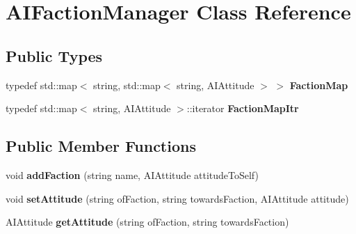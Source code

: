 \hypertarget{classAIFactionManager}{
\section{\-A\-I\-Faction\-Manager \-Class \-Reference}
\label{d2/db2/classAIFactionManager}
}
\subsection*{\-Public \-Types}
\begin{DoxyCompactItemize}
\item 
\hypertarget{classAIFactionManager_a6063adb15104d0396201d3a833c42b50}{
typedef std\-::map$<$ string, \*
std\-::map$<$ string, \-A\-I\-Attitude $>$ $>$ {\bfseries \-Faction\-Map}}
\label{d2/db2/classAIFactionManager_a6063adb15104d0396201d3a833c42b50}

\item 
\hypertarget{classAIFactionManager_a6bdacc5758c36c0369dd50d7816529f6}{
typedef std\-::map$<$ string, \*
\-A\-I\-Attitude $>$\-::iterator {\bfseries \-Faction\-Map\-Itr}}
\label{d2/db2/classAIFactionManager_a6bdacc5758c36c0369dd50d7816529f6}

\end{DoxyCompactItemize}
\subsection*{\-Public \-Member \-Functions}
\begin{DoxyCompactItemize}
\item 
\hypertarget{classAIFactionManager_a23a4aa0eeec79f6a33266de652941336}{
void {\bfseries add\-Faction} (string name, \-A\-I\-Attitude attitude\-To\-Self)}
\label{d2/db2/classAIFactionManager_a23a4aa0eeec79f6a33266de652941336}

\item 
\hypertarget{classAIFactionManager_a8d59f0824b36f0da3352c3baa2a68179}{
void {\bfseries set\-Attitude} (string of\-Faction, string towards\-Faction, \-A\-I\-Attitude attitude)}
\label{d2/db2/classAIFactionManager_a8d59f0824b36f0da3352c3baa2a68179}

\item 
\hypertarget{classAIFactionManager_a1b588af84b1e4866c87ca4591f08d911}{
\-A\-I\-Attitude {\bfseries get\-Attitude} (string of\-Faction, string towards\-Faction)}
\label{d2/db2/classAIFactionManager_a1b588af84b1e4866c87ca4591f08d911}

\end{DoxyCompactItemize}
